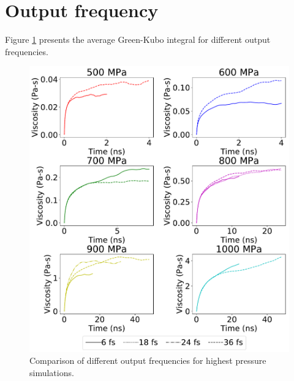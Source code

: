 \documentclass[preprint,review,11pt]{elsarticle}
\begin{document}
    \clearpage
    \newpage

    \section{Output frequency} \label{SI:Output frequency}
    
    Figure \ref{fig:compare_output_frequency} presents the average Green-Kubo integral for different output frequencies. 	
    
    \begin{figure}[htb!]
    	\centering
    	\includegraphics[width=6.4in]{output_freq_all.pdf}
    	\caption{Comparison of different output frequencies for highest pressure simulations.}
    	\label{fig:compare_output_frequency}
    \end{figure}

		
%		
%	
%	
%	
	
\end{document}
